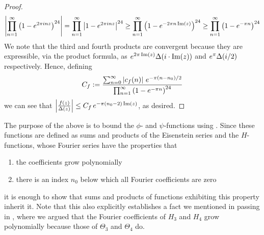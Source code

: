\begin{proof}
    \begin{align*}
        \left\lvert \prod_{n=1}^{\infty} \left( 1 - e^{2 \pi i n z} \right)^{24} \right\rvert
        = \prod_{n=1}^{\infty} \left\lvert 1 - e^{2 \pi i n z} \right\rvert^{24}
        \geq \prod_{n=1}^{\infty} \left( 1 - e^{-2 \pi n \operatorname{Im}(z)} \right)^{24}
        \geq \prod_{n=1}^{\infty}\left( 1 - e^{-\pi n} \right)^{24}
    \end{align*}
    We note that the third and fourth products are convergent because they are expressible, via the product formula, as $e^{2\pi\operatorname{Im}(z)} \Delta\!\left( i \cdot \operatorname{Im}(z) \right)$ and $e^{\pi} \Delta\!\left( i/2 \right)$ respectively. Hence, defining
    \begin{align*}
        C_f := \frac{\sum_{n=0}^{\infty} \left\lvert c_f(n) \right\rvert \, e^{-\pi \left( n - n_0 \right)/2}}{\prod_{n=1}^{\infty}\left( 1 - e^{-\pi n} \right)^{24}}
    \end{align*}
    we can see that $\left\lvert \frac{f(z)}{\Delta(z)} \right\rvert \leq C_f \, e^{-\pi \left( n_0 - 2 \right) \operatorname{Im}(z)}$, as desired.
\end{proof}

The purpose of the above is to bound the $\phi$- and $\psi$-functions using . Since these functions are defined as sums and products of the Eisenstein series and the $H$-functions, whose Fourier series have the properties that
\begin{enumerate}
    \item the coefficients grow polynomially
    \item there is an index $n_0$ below which all Fourier coefficients are zero
\end{enumerate}
it is enough to show that sums and products of functions exhibiting this property inherit it. Note that this also explicitly establishes a fact we mentioned in passing in , where we argued that the Fourier coefficients of $H_3$ and $H_4$ grow polynomially because those of $\Theta_3$ and $\Theta_4$ do.

